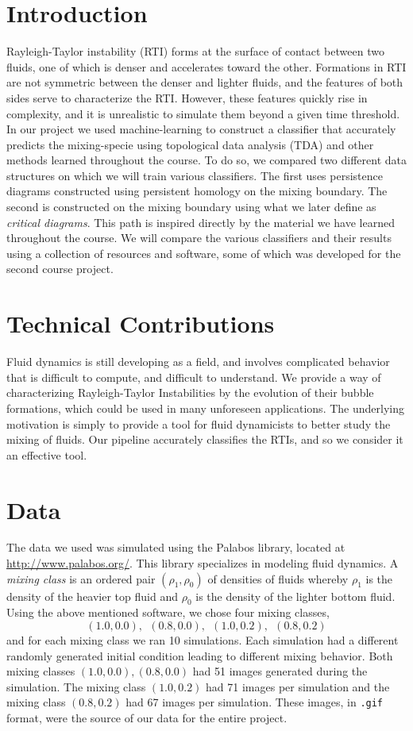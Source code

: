 \documentclass[12pt, fullpage,letterpaper]{article}
\theoremstyle{definition}
\begin{document}
	\section*{\normalfont Introduction}
	Rayleigh-Taylor instability (RTI) forms at the surface of contact between two fluids, one of which is denser and accelerates toward the other. Formations in RTI are not symmetric between the denser and lighter fluids, and the features of both sides serve to characterize the RTI. However, these features quickly rise in complexity, and it is unrealistic to simulate them beyond a given time threshold. In our project we used machine-learning to construct a classifier that accurately predicts the mixing-specie using topological data analysis (TDA) and other methods learned throughout the course. To do so, we compared two different data structures on which we will train various classifiers. The first uses persistence diagrams constructed using persistent homology on the mixing boundary. The second is constructed on the mixing boundary using what we later define as \emph{critical diagrams}. This path is inspired directly by the material we have learned throughout the course. We will compare the various classifiers and their results using a collection of resources and software, some of which was developed for the second course project.
	
	\section*{\normalfont Technical Contributions}
	Fluid dynamics is still developing as a field, and involves complicated behavior that is difficult to compute, and difficult to understand. We provide a way of characterizing Rayleigh-Taylor Instabilities by the evolution of their bubble formations, which could be used in many unforeseen applications. The underlying motivation is simply to provide a tool for fluid dynamicists to better study the mixing of fluids. Our pipeline accurately classifies the RTIs, and so we consider it an effective tool.
	
	
	\section*{\normalfont Data}
	The data we used was simulated using the Palabos library, located at \url{http://www.palabos.org/}. This library specializes in modeling fluid dynamics. A \emph{mixing class} is an ordered pair $(\rho_1, \rho_0)$ of densities of fluids whereby $\rho_1$ is the density of the heavier top fluid and $\rho_0$ is the density of the lighter bottom fluid. Using the above mentioned software, we chose four mixing classes, 
	$$
		(1.0, 0.0), \ \ (0.8, 0.0), \ \ (1.0, 0.2), \ \ (0.8, 0.2)
	$$
	and for each mixing class we ran 10 simulations. Each simulation had a different randomly generated initial condition leading to different mixing behavior. Both mixing classes $(1.0, 0.0), (0.8, 0.0)$ had 51 images generated during the simulation. The mixing class $(1.0, 0.2)$ had 71 images per simulation and the mixing class $(0.8, 0.2)$ had 67 images per simulation. These images, in \texttt{.gif} format, were the source of our data for the entire project. 
	
\end{document}
